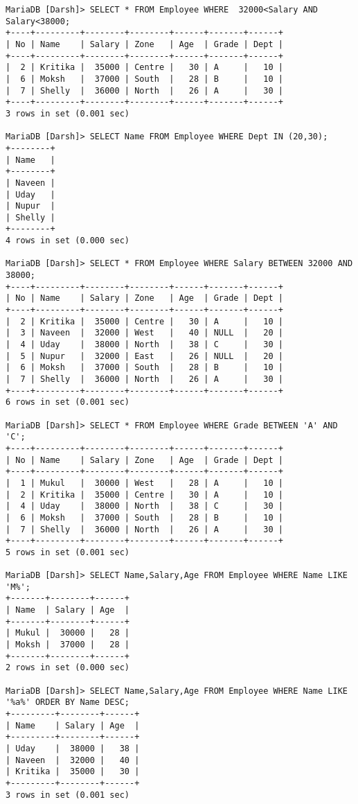 \documentclass[
a4paper]{article}
\begin{document}
\begin{lstlisting}
MariaDB [Darsh]> SELECT * FROM Employee WHERE  32000<Salary AND Salary<38000;
+----+---------+--------+--------+------+-------+------+
| No | Name    | Salary | Zone   | Age  | Grade | Dept |
+----+---------+--------+--------+------+-------+------+
|  2 | Kritika |  35000 | Centre |   30 | A     |   10 |
|  6 | Moksh   |  37000 | South  |   28 | B     |   10 |
|  7 | Shelly  |  36000 | North  |   26 | A     |   30 |
+----+---------+--------+--------+------+-------+------+
3 rows in set (0.001 sec)

MariaDB [Darsh]> SELECT Name FROM Employee WHERE Dept IN (20,30);
+--------+
| Name   |
+--------+
| Naveen |
| Uday   |
| Nupur  |
| Shelly |
+--------+
4 rows in set (0.000 sec)

MariaDB [Darsh]> SELECT * FROM Employee WHERE Salary BETWEEN 32000 AND 38000;
+----+---------+--------+--------+------+-------+------+
| No | Name    | Salary | Zone   | Age  | Grade | Dept |
+----+---------+--------+--------+------+-------+------+
|  2 | Kritika |  35000 | Centre |   30 | A     |   10 |
|  3 | Naveen  |  32000 | West   |   40 | NULL  |   20 |
|  4 | Uday    |  38000 | North  |   38 | C     |   30 |
|  5 | Nupur   |  32000 | East   |   26 | NULL  |   20 |
|  6 | Moksh   |  37000 | South  |   28 | B     |   10 |
|  7 | Shelly  |  36000 | North  |   26 | A     |   30 |
+----+---------+--------+--------+------+-------+------+
6 rows in set (0.001 sec)

MariaDB [Darsh]> SELECT * FROM Employee WHERE Grade BETWEEN 'A' AND 'C';
+----+---------+--------+--------+------+-------+------+
| No | Name    | Salary | Zone   | Age  | Grade | Dept |
+----+---------+--------+--------+------+-------+------+
|  1 | Mukul   |  30000 | West   |   28 | A     |   10 |
|  2 | Kritika |  35000 | Centre |   30 | A     |   10 |
|  4 | Uday    |  38000 | North  |   38 | C     |   30 |
|  6 | Moksh   |  37000 | South  |   28 | B     |   10 |
|  7 | Shelly  |  36000 | North  |   26 | A     |   30 |
+----+---------+--------+--------+------+-------+------+
5 rows in set (0.001 sec)

MariaDB [Darsh]> SELECT Name,Salary,Age FROM Employee WHERE Name LIKE 'M%';
+-------+--------+------+
| Name  | Salary | Age  |
+-------+--------+------+
| Mukul |  30000 |   28 |
| Moksh |  37000 |   28 |
+-------+--------+------+
2 rows in set (0.000 sec)

MariaDB [Darsh]> SELECT Name,Salary,Age FROM Employee WHERE Name LIKE '%a%' ORDER BY Name DESC;
+---------+--------+------+
| Name    | Salary | Age  |
+---------+--------+------+
| Uday    |  38000 |   38 |
| Naveen  |  32000 |   40 |
| Kritika |  35000 |   30 |
+---------+--------+------+
3 rows in set (0.001 sec)


\end{lstlisting}
\end{document}
